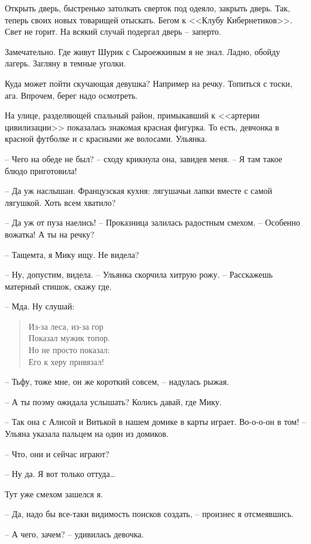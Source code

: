 \documentclass[a4paper]{book}
\begin{document}
Открыть дверь, быстренько затолкать сверток под одеяло, закрыть дверь. Так, теперь своих новых товарищей отыскать. Бегом к <<Клубу Кибернетиков>>. Свет не горит. На всякий случай подергал дверь -- заперто. 

Замечательно. Где живут Шурик с Сыроежкиным я не знал. Ладно, обойду лагерь. Загляну в темные уголки. 

Куда может пойти скучающая девушка? Например на речку. Топиться с тоски, ага. Впрочем, берег надо осмотреть.

На улице, разделяющей спальный район, примыкавший к <<артерии цивилизации>> показалась знакомая красная фигурка. То есть, девчонка в красной футболке и с красными же волосами. Ульянка.

-- Чего на обеде не был? -- сходу крикнула она, завидев меня. -- Я там такое блюдо приготовила!

-- Да уж наслышан. Французская кухня: лягушачьи лапки вместе с самой лягушкой. Хоть всем хватило?

-- Да уж от пуза наелись! -- Проказница залилась радостным смехом. -- Особенно вожатка! А ты на речку?

-- Тащемта, я Мику ищу. Не видела?

-- Ну, допустим, видела. -- Ульянка скорчила хитрую рожу. -- Расскажешь матерный стишок, скажу где.

-- Мда. Ну слушай:
\begin{verse}
	Из-за леса, из-за гор\\
	Показал мужик топор.\\
	Но не просто показал:\\
	Его к херу привязал!\\ 
\end{verse}

-- Тьфу, тоже мне, он же короткий совсем, -- надулась рыжая.

-- А ты поэму ожидала услышать? Колись давай, где Мику.

-- Так она с Алисой и Витькой в нашем домике в карты играет. Во-о-о-он в том! -- Ульяна указала пальцем на один из домиков. 

-- Что, они и сейчас играют?

-- Ну да. Я вот только оттуда\ldots

Тут уже смехом зашелся я.

-- Да, надо бы все-таки видимость поисков создать, -- произнес я отсмеявшись.

-- А чего, зачем? -- удивилась девочка.
\end{document}
